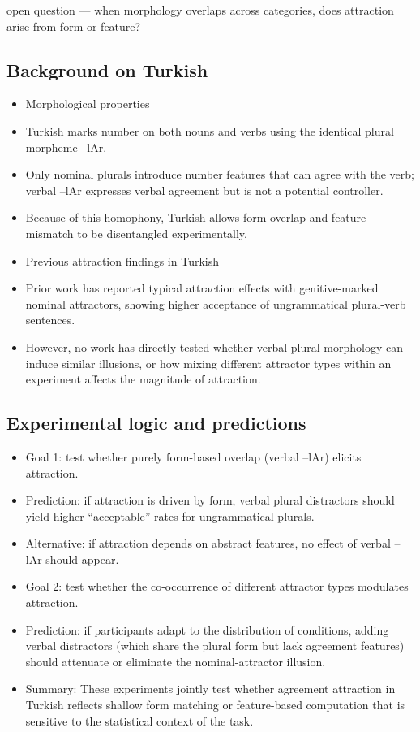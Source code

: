 \documentclass[
  authoryear,
  preprint]{elsarticle}
\begin{document}
open question --- when morphology overlaps across categories, does
attraction arise from form or feature?

\subsection{Background on Turkish}\label{background-on-turkish}

\begin{itemize}
\item
  Morphological properties
\item
  Turkish marks number on both nouns and verbs using the identical
  plural morpheme --lAr.
\item
  Only nominal plurals introduce number features that can agree with the
  verb; verbal --lAr expresses verbal agreement but is not a potential
  controller.
\item
  Because of this homophony, Turkish allows form-overlap and
  feature-mismatch to be disentangled experimentally.
\item
  Previous attraction findings in Turkish
\item
  Prior work has reported typical attraction effects with
  genitive-marked nominal attractors, showing higher acceptance of
  ungrammatical plural-verb sentences.
\item
  However, no work has directly tested whether verbal plural morphology
  can induce similar illusions, or how mixing different attractor types
  within an experiment affects the magnitude of attraction.
\end{itemize}

\subsection{Experimental logic and
predictions}\label{experimental-logic-and-predictions}

\begin{itemize}
\item
  Goal 1: test whether purely form-based overlap (verbal --lAr) elicits
  attraction.
\item
  Prediction: if attraction is driven by form, verbal plural distractors
  should yield higher ``acceptable'' rates for ungrammatical plurals.
\item
  Alternative: if attraction depends on abstract features, no effect of
  verbal --lAr should appear.
\item
  Goal 2: test whether the co-occurrence of different attractor types
  modulates attraction.
\item
  Prediction: if participants adapt to the distribution of conditions,
  adding verbal distractors (which share the plural form but lack
  agreement features) should attenuate or eliminate the
  nominal-attractor illusion.
\item
  Summary: These experiments jointly test whether agreement attraction
  in Turkish reflects shallow form matching or feature-based computation
  that is sensitive to the statistical context of the task.
\end{itemize}
\end{document}
